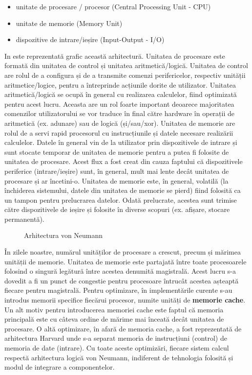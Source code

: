 \begin{itemize}
  \item unitate de procesare / procesor (Central Processing Unit - CPU) 
  \item unitate de memorie (Memory Unit) 
  \item dispozitive de intrare/ieșire (Input-Output - I/O)
\end{itemize}

In  este reprezentată grafic această arhitectură.
Unitatea de procesare este formată din unitatea de control și unitatea aritmetică/logică.
Unitatea de control are rolul de a configura și de a transmite comenzi perifericelor, respectiv unității aritmetice/logice, pentru a întreprinde acțiunile dorite de utilizator.
Unitatea aritmetică/logică se ocupă în general cu realizarea calculelor, fiind optimizată pentru acest lucru.
Aceasta are un rol foarte important deoarece majoritatea comenzilor utilizatorului se vor traduce în final către hardware în operații de aritmetică (ex. adunare) sau de logică (și/sau/xor).
Unitatea de memorie are rolul de a servi rapid procesorul cu instrucțiunile și datele necesare realizării calculelor.
Datele în general vin de la utilizator prin dispozitivele de intrare și sunt stocate temporar de unitatea de memorie pentru a putea fi folosite de unitatea de procesare.
Acest flux a fost creat din cauza faptului că dispozitivele periferice (intrare/ieșire) sunt, în general, mult mai lente decât unitatea de procesare și ar încetini-o.
Unitatea de memorie este, în general, volatilă (la închiderea sistemului, datele din unitatea de memorie se pierd) fiind folosită ca un tampon pentru prelucrarea datelor.
Odată prelucrate, acestea sunt trimise către dispozitivele de ieșire și folosite în diverse scopuri (ex. afișare, stocare permanentă).

\begin{figure}[!htbp]
  \centering
  \def\svgwidth{0.8\columnwidth}
  
  \caption{Arhitectura von Neumann}
  \label{fig:hw:von-neumann}
\end{figure}

În zilele noastre, numărul unităților de procesare a crescut, precum și mărimea unității de memorie.
Unitatea de memorie este partajată între toate procesoarele folosind o singură legătură între acestea denumită magistrală.
Acest lucru s-a dovedit a fi un punct de congestie pentru procesoare întrucât acestea așteaptă fiecare pentru magistrală.
Pentru optimizare, în implementările curente s-au introdus memorii specifice fiecărui procesor, numite unități de \textbf{memorie cache}.
Un alt motiv pentru introducerea memoriei cache este faptul că memoria principală este cu câteva ordine de mărime mai înceată decât unitatea de procesare.
O altă optimizare, în afară de memoria cache, a fost reprezentată de arhitectura Harvard unde s-a separat memoria de instrucțiuni (control) de memoria de date (intrare).
Cu toate aceste optimizări, fiecare sistem calcul respectă arhitectura logică von Neumann, indiferent de tehnologia folosită și modul de integrare a componentelor.

